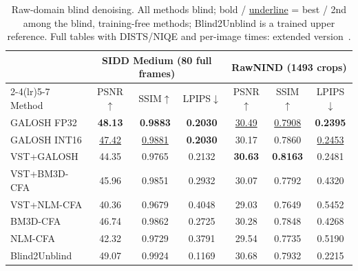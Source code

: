 \documentclass[journal]{IEEEtran}
\begin{document}
\begin{table}[t]
\centering
\caption{Raw-domain blind denoising. All methods blind; bold /
\underline{underline} = best / 2nd among the blind, training-free methods;
Blind2Unblind is a trained upper reference. Full tables with DISTS/NIQE and
per-image times: extended version~\cite{galosharxiv}.}
\label{tab:raw}
\setlength{\tabcolsep}{3pt}
\footnotesize
\begin{tabular}{l ccc ccc}
\toprule
 & \multicolumn{3}{c}{SIDD Medium (80 full frames)} & \multicolumn{3}{c}{RawNIND (1493 crops)}\\
\cmidrule(lr){2-4}\cmidrule(lr){5-7}
Method & PSNR$\uparrow$ & SSIM$\uparrow$ & LPIPS$\downarrow$ & PSNR$\uparrow$ & SSIM$\uparrow$ & LPIPS$\downarrow$\\
\midrule
GALOSH FP32   & \textbf{48.13} & \textbf{0.9883} & \textbf{0.2030} & \underline{30.49} & \underline{0.7908} & \textbf{0.2395}\\
GALOSH INT16  & \underline{47.42} & \underline{0.9881} & \textbf{0.2030} & 30.17 & 0.7860 & \underline{0.2453}\\
VST+GALOSH    & 44.35 & 0.9765 & 0.2132 & \textbf{30.63} & \textbf{0.8163} & 0.2481\\
VST+BM3D-CFA  & 45.96 & 0.9851 & 0.2932 & 30.07 & 0.7792 & 0.4320\\
VST+NLM-CFA   & 40.36 & 0.9679 & 0.4048 & 29.03 & 0.7649 & 0.5452\\
BM3D-CFA      & 46.74 & 0.9862 & 0.2725 & 30.28 & 0.7848 & 0.4268\\
NLM-CFA       & 42.32 & 0.9729 & 0.3791 & 29.54 & 0.7735 & 0.5190\\
\midrule
Blind2Unblind & 49.07 & 0.9924 & 0.1169 & 30.68 & 0.7932 & 0.2215\\
\bottomrule
\end{tabular}
\end{table}
\end{document}
